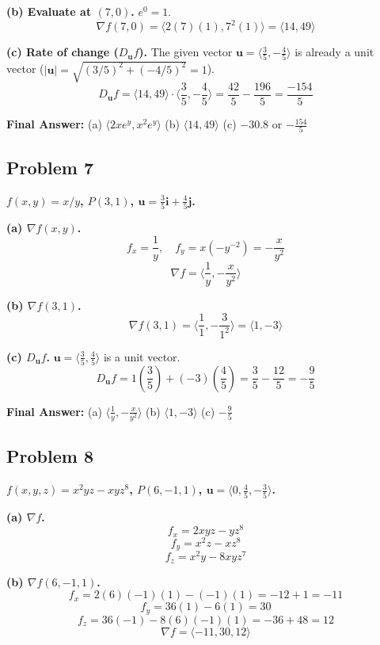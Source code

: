 \documentclass{article}
\begin{document}
\textbf{(b) Evaluate at $(7, 0)$.}
$e^0 = 1$.
\[ \nabla f(7, 0) = \langle 2(7)(1), 7^2(1) \rangle = \langle 14, 49 \rangle \]

\textbf{(c) Rate of change ($D_{\mathbf{u}}f$).}
The given vector $\mathbf{u} = \langle \frac{3}{5}, -\frac{4}{5} \rangle$ is already a unit vector ($|\mathbf{u}| = \sqrt{(3/5)^2 + (-4/5)^2} = 1$).
\[ D_{\mathbf{u}}f = \langle 14, 49 \rangle \cdot \langle \frac{3}{5}, -\frac{4}{5} \rangle = \frac{42}{5} - \frac{196}{5} = \frac{-154}{5} \]

\textbf{Final Answer:}
(a) $\langle 2xe^y, x^2e^y \rangle$ \quad (b) $\langle 14, 49 \rangle$ \quad (c) $\boxed{-30.8}$ or $\boxed{-\frac{154}{5}}$

\hrulefill

\subsection*{Problem 7}
\textbf{$f(x, y) = x/y$, $P(3, 1)$, $\mathbf{u} = \frac{3}{5}\mathbf{i} + \frac{4}{5}\mathbf{j}$.}

\textbf{(a) $\nabla f(x, y)$.}
\[ f_x = \frac{1}{y}, \quad f_y = x(-y^{-2}) = -\frac{x}{y^2} \]
\[ \nabla f = \langle \frac{1}{y}, -\frac{x}{y^2} \rangle \]

\textbf{(b) $\nabla f(3, 1)$.}
\[ \nabla f(3, 1) = \langle \frac{1}{1}, -\frac{3}{1^2} \rangle = \langle 1, -3 \rangle \]

\textbf{(c) $D_{\mathbf{u}}f$.}
$\mathbf{u} = \langle \frac{3}{5}, \frac{4}{5} \rangle$ is a unit vector.
\[ D_{\mathbf{u}}f = 1(\frac{3}{5}) + (-3)(\frac{4}{5}) = \frac{3}{5} - \frac{12}{5} = -\frac{9}{5} \]

\textbf{Final Answer:}
(a) $\langle \frac{1}{y}, -\frac{x}{y^2} \rangle$ \quad (b) $\langle 1, -3 \rangle$ \quad (c) $\boxed{-\frac{9}{5}}$

\hrulefill

\subsection*{Problem 8}
\textbf{$f(x, y, z) = x^2 yz - xyz^8$, $P(6, -1, 1)$, $\mathbf{u} = \langle 0, \frac{4}{5}, -\frac{3}{5} \rangle$.}

\textbf{(a) $\nabla f$.}
\[ f_x = 2xyz - yz^8 \]
\[ f_y = x^2z - xz^8 \]
\[ f_z = x^2y - 8xyz^7 \]

\textbf{(b) $\nabla f(6, -1, 1)$.}
\[ f_x = 2(6)(-1)(1) - (-1)(1) = -12 + 1 = -11 \]
\[ f_y = 36(1) - 6(1) = 30 \]
\[ f_z = 36(-1) - 8(6)(-1)(1) = -36 + 48 = 12 \]
\[ \nabla f = \langle -11, 30, 12 \rangle \]
\end{document}
